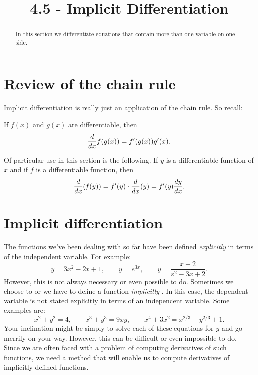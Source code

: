 \documentclass{ximera}
\title{4.5 - Implicit Differentiation}
\begin{document}
\begin{abstract}
In this section we differentiate equations that contain more than one variable on one side.
\end{abstract}
\maketitle
\section{Review of the chain rule}

Implicit differentiation is really just an application of the chain rule.
So recall:

\begin{theorem}
If $f(x)$ and $g(x)$ are differentiable, then
\[
\ddx f(g(x)) = f'(g(x))g'(x).
\]
\end{theorem}

Of particular use in this section is the following.  
If $y$ is a differentiable function of $x$ and if $f$ is a differentiable function, then
\[
\ddx (f(y)) = f'(y) \cdot \ddx (y) = f'(y) \dd[y]{x}.
\]

\section{Implicit differentiation}

The functions we've been dealing with so far have been
defined \textit{explicitly}
 in terms of the independent
variable. For example:
\[
y=3x^2-2x+1,\qquad y=e^{3x}, \qquad y = \frac{x-2}{x^2-3x+2}.
\]
However, this is not always  necessary or even possible to do. Sometimes we choose to or we have to define a function  \textit{implicitly
 }. In this case, the dependent variable is not stated
explicitly in terms of an independent variable. Some examples are:
\[
x^2+y^2 = 4,\qquad x^3+y^3 = 9xy, \qquad x^4+3x^2 = x^{2/3}+y^{2/3} + 1.
\]
Your inclination might be simply to solve each of these equations for $y$ and go
merrily on your way. However, this can be difficult or even impossible to do.
Since we are often faced with a problem of computing derivatives of such functions,
we need a  method that will enable us to compute derivatives of implicitly defined functions.
  
\end{document}
